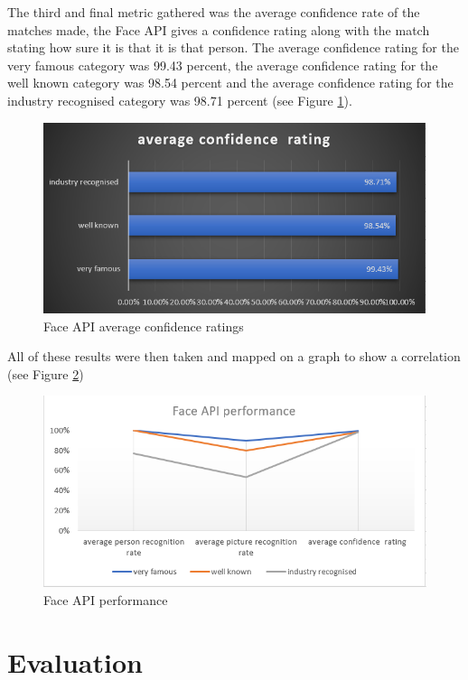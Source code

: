 \documentclass[12pt,a4paper]{article}
\begin{document}
The third and final metric gathered was the average confidence rate of the matches made, the Face API gives a confidence rating along with the match stating how sure it is that it is that person. The average confidence rating for the very famous category was 99.43 percent, the average confidence rating for the well known category was 98.54 percent and the average confidence rating for the industry recognised category was 98.71 percent (see Figure \ref{fer3}). 

\begin{figure}[!ht]
    \centering
    \includegraphics[width=1.0\textwidth]{Figs/faceevalr3.PNG} 
    \caption{Face API average confidence ratings} 
    \label{fer3}
\end{figure} 

All of these results were then taken and mapped on a graph to show a correlation (see Figure \ref{fer4}) 

\begin{figure}[!ht]
    \centering
    \includegraphics[width=1.0\textwidth]{Figs/faceevalr4.PNG} 
    \caption{Face API performance} 
    \label{fer4}
\end{figure}

\newpage
\section{Evaluation}
\end{document}
